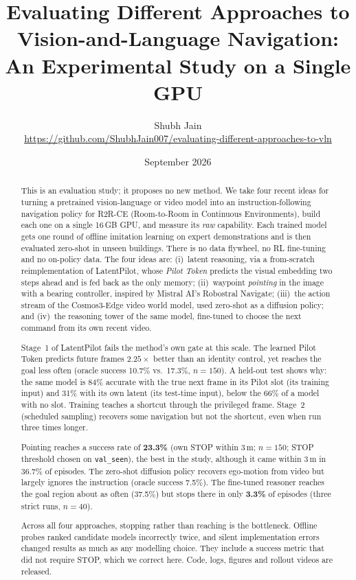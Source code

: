 \documentclass[11pt]{article}
\title{Evaluating Different Approaches to Vision-and-Language Navigation:\\An Experimental Study on a Single GPU}
\author{Shubh Jain\\[2pt]\small\url{https://github.com/ShubhJain007/evaluating-different-approaches-to-vln}}
\date{September 2026}
\begin{document}
\maketitle

\begin{abstract}
This is an evaluation study; it proposes no new method. We take four recent ideas for turning a pretrained
vision-language or video model into an instruction-following navigation policy for R2R-CE (Room-to-Room in Continuous Environments), build each one on a
single 16\,GB GPU, and measure its \emph{raw} capability. Each trained model gets one round of offline imitation
learning on expert demonstrations and is then evaluated zero-shot in unseen buildings. There is no data flywheel, no
RL fine-tuning and no on-policy data. The four ideas are:
(i)~latent reasoning, via a from-scratch reimplementation of LatentPilot, whose \emph{Pilot Token} predicts the visual
embedding two steps ahead and is fed back as the only memory;
(ii)~waypoint \emph{pointing} in the image with a bearing controller, inspired by Mistral AI's Robostral Navigate;
(iii)~the action stream of the Cosmos3-Edge video world model, used zero-shot as a diffusion policy; and
(iv)~the reasoning tower of the same model, fine-tuned to choose the next command from its own recent video.

Stage~1 of LatentPilot fails the method's own gate at this scale. The learned Pilot Token predicts future frames
$2.25\times$ better than an identity control, yet reaches the goal less often (oracle success 10.7\% vs.\ 17.3\%,
$n{=}150$). A held-out test shows why: the same model is 84\% accurate with the true next frame in its Pilot slot (its
training input) and 31\% with its own latent (its test-time input), below the 66\% of a model with no slot. Training
teaches a shortcut through the privileged frame. Stage~2 (scheduled sampling) recovers some navigation but not
the shortcut, even when run three times longer.

Pointing reaches a success rate of \textbf{23.3\%} (own STOP within 3\,m; $n{=}150$; STOP threshold chosen on
\texttt{val\_seen}), the best in the study, although it came within 3\,m in 36.7\% of episodes. The zero-shot diffusion
policy recovers ego-motion from video but largely ignores the instruction (oracle success 7.5\%). The fine-tuned
reasoner reaches the goal region about as often (37.5\%) but stops there in only \textbf{3.3\%} of episodes (three
strict runs, $n{=}40$).

Across all four approaches, stopping rather than reaching is the bottleneck. Offline probes ranked candidate models
incorrectly twice, and silent implementation errors changed results as much as any modelling choice. They include a
success metric that did not require STOP, which we correct here. Code, logs, figures and rollout videos are released.
\end{abstract}
\end{document}
